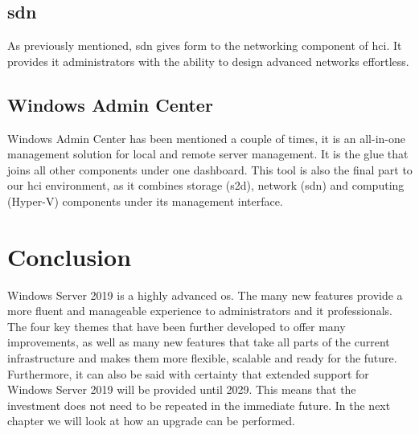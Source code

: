 \subsection{\acrfull{sdn}}
As previously mentioned, \acrshort{sdn} gives form to the networking component of \acrshort{hci}. It provides \acrshort{it} administrators with the ability to design advanced networks effortless.
\subsection{Windows Admin Center}
Windows Admin Center has been mentioned a couple of times, it is an all-in-one management solution for local and remote server management. It is the glue that joins all other components under one dashboard. This tool is also the final part to our \acrshort{hci} environment, as it combines storage (\acrshort{s2d}), network (\acrshort{sdn}) and computing (Hyper-V) components under its management interface. 


\section{Conclusion}
Windows Server 2019 is a highly advanced \acrfull{os}. The many new features provide a more fluent and manageable experience to administrators and \acrshort{it} professionals. The four key themes that have been further developed to offer many improvements, as well as many new features that take all parts of the current infrastructure and makes them more flexible, scalable and ready for the future. Furthermore, it can also be said with certainty that extended support for Windows Server 2019 will be provided until 2029. This means that the investment does not need to be repeated in the immediate future. In the next chapter we will look at how an upgrade can be performed.  
